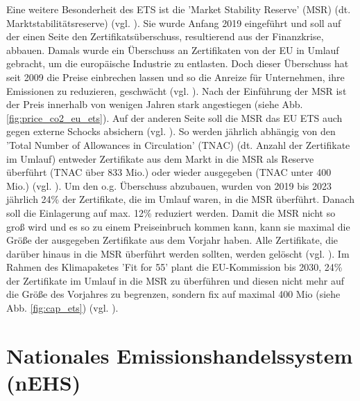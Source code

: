 Eine weitere Besonderheit des ETS ist die 'Market Stability Reserve' (MSR) (dt. Marktstabilitätsreserve) (vgl. \cite{eu3.2023}). Sie wurde Anfang 2019 eingeführt und soll auf der einen Seite den Zertifikatsüberschuss, resultierend aus der Finanzkrise, abbauen.
Damals wurde ein Überschuss an Zertifikaten von der EU in Umlauf gebracht, um die europäische Industrie zu entlasten.
Doch dieser Überschuss hat seit 2009 die Preise einbrechen lassen und so die Anreize für Unternehmen, ihre Emissionen zu reduzieren, geschwächt (vgl. \cite{eu3.2023}). Nach der Einführung der MSR ist der Preis innerhalb von wenigen Jahren stark angestiegen (siehe Abb. \ref{fig:price_co2_eu_ets}).
Auf der anderen Seite soll die MSR das EU ETS auch gegen externe Schocks absichern (vgl. \cite{eu3.2023}).
So werden jährlich abhängig von den 'Total Number of Allowances in Circulation' (TNAC) (dt. Anzahl der Zertifikate im Umlauf) entweder Zertifikate aus dem Markt in die MSR als Reserve überführt (TNAC über 833 Mio.) oder wieder ausgegeben (TNAC unter 400 Mio.) (vgl. \cite[S. 7]{icap2.2023}).
Um den o.g. Überschuss abzubauen, wurden von 2019 bis 2023 jährlich 24\% der Zertifikate, die im Umlauf waren, in die MSR überführt.
Danach soll die Einlagerung auf max. 12\% reduziert werden. Damit die MSR nicht so groß wird und es so zu einem Preiseinbruch kommen kann, kann sie maximal die Größe der ausgegeben Zertifikate aus dem Vorjahr haben.
Alle Zertifikate, die darüber hinaus in die MSR überführt werden sollten, werden gelöscht (vgl. \cite{eu3.2023}).
Im Rahmen des Klimapaketes 'Fit for 55' plant die EU-Kommission bis 2030, 24\% der Zertifikate im Umlauf in die MSR zu überführen und diesen nicht mehr auf die Größe des Vorjahres zu begrenzen, sondern fix auf maximal 400 Mio (siehe Abb. \ref{fig:cap_ets}) (vgl. \cite{ub.2023}).

\section{Nationales Emissionshandelssystem (nEHS)}

